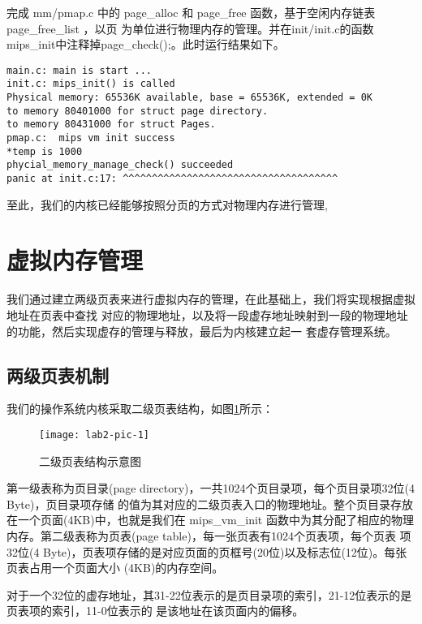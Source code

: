 \begin{exercise}
完成 mm/pmap.c 中的 page\_alloc 和 page\_free 函数，基于空闲内存链表 page\_free\_list ，以页
	为单位进行物理内存的管理。并在init/init.c的函数mips\_init中注释掉page\_check();。此时运行结果如下。
\end{exercise}

\begin{verbatim}
main.c: main is start ...
init.c: mips_init() is called
Physical memory: 65536K available, base = 65536K, extended = 0K
to memory 80401000 for struct page directory.
to memory 80431000 for struct Pages.
pmap.c:  mips vm init success
*temp is 1000
phycial_memory_manage_check() succeeded
panic at init.c:17: ^^^^^^^^^^^^^^^^^^^^^^^^^^^^^^^^^^^^^
\end{verbatim}


至此，我们的内核已经能够按照分页的方式对物理内存进行管理,

\section{虚拟内存管理}

我们通过建立两级页表来进行虚拟内存的管理，在此基础上，我们将实现根据虚拟地址在页表中查找
对应的物理地址，以及将一段虚存地址映射到一段的物理地址的功能，然后实现虚存的管理与释放，最后为内核建立起一
套虚存管理系统。

\subsection{两级页表机制}

我们的操作系统内核采取二级页表结构，如图\ref{lab2-pic-1}所示：

\begin{figure}[htbp]
  \centering
  \texttt{[image: lab2-pic-1]}
  \caption{二级页表结构示意图}\label{lab2-pic-1}
\end{figure}

第一级表称为页目录(page directory)，一共1024个页目录项，每个页目录项32位(4 Byte)，页目录项存储
的值为其对应的二级页表入口的物理地址。整个页目录存放在一个页面(4KB)中，也就是我们在 mips\_vm\_init
函数中为其分配了相应的物理内存。第二级表称为页表(page table)，每一张页表有1024个页表项，每个页表
项32位(4 Byte)，页表项存储的是对应页面的页框号(20位)以及标志位(12位)。每张页表占用一个页面大小
(4KB)的内存空间。

对于一个32位的虚存地址，其31-22位表示的是页目录项的索引，21-12位表示的是页表项的索引，11-0位表示的
是该地址在该页面内的偏移。

